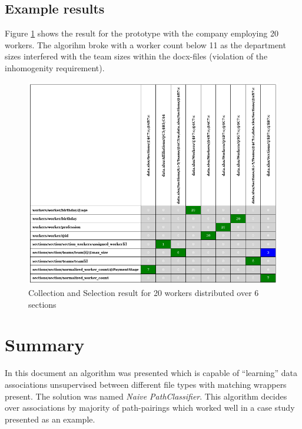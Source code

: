 \documentclass[conference]{IEEEtran}
\begin{document}
\subsection{Example results}
Figure \ref{example_table} shows the result for the prototype with the company employing 20
workers. The algorihm broke with a worker count below 11 as the department sizes interfered
with the team sizes within the docx-files (violation of the inhomogenity requirement).
\begin{figure}[ht]
 \centering
 \includegraphics[scale=0.42]{img/example_table}
 \caption{Collection and Selection result for 20 workers distributed over 6 sections}
 \label{example_table}
\end{figure}

\section{Summary}
In this document an algorithm was presented which is capable of ``learning'' data
associations unsupervised  between different file types with matching wrappers present.
The solution was named \textit{Naive PathClassifier}. This algorithm decides over
associations by majority of path-pairings which worked well in a case study presented
as an example. 

\printbibliography
\end{document}

